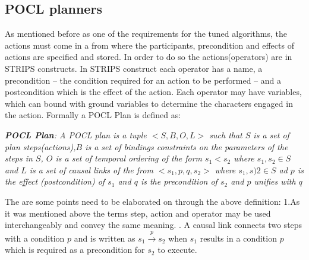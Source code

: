 \documentclass[english]{tktltiki}
\begin{document}
\subsection{POCL planners}
As mentioned before as one of the requirements for the tuned algorithms, the actions must come in a from where the participants, precondition and effects of actions are specified and stored. In order to do so the actions(operators) are in STRIPS constructs. In STRIPS construct each operator has a name, a precondition -- the condition required for an action to be performed -- and a postcondition which is the effect of the action. Each operator may have variables, which can bound with ground variables to determine the characters engaged in the action. Formally a POCL Plan is defined as:
\begin{flushleft}
\textit{\textbf{POCL Plan}: A POCL plan is a tuple $<S,B,O,L>$ such that $S$ is a set of plan steps(actions),$B$ is a set of bindings constraints on the parameters of the steps in $S$, $O$ is a set of temporal ordering of the form $s_1 < s_2$ where $s_1,s_2 \in S$ and $L$ is a set of causal links of the from $<s_1,p,q,s_2>$ where $s_1,s)2 \in S$ ad $p$ is the effect (postcondition) of $s_1$ and $q$ is the precondition of $s_2$ and $p$ unifies with $q$ }
\end{flushleft}
The are some points need to be elaborated on through the above definition: 
1.As it was mentioned above the terms step, action and operator may be used interchangeably and convey the same meaning. . A causal link  connects two steps with a condition $p$ and is written as $s_1 \xrightarrow{p} s_2$ when $s_1$ results in a condition $p$ which is required as a precondition for $s_2$ to execute. \newline
\end{document}

